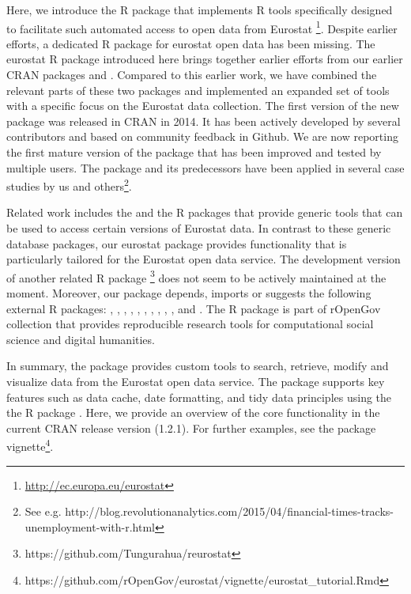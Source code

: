 Here, we introduce the  R package that implements R
tools specifically designed to facilitate such automated access to
open data from
Eurostat \footnote{\url{http://ec.europa.eu/eurostat}}. Despite
earlier efforts, a dedicated R package for eurostat open data has been
missing. The eurostat R package introduced here brings together
earlier efforts from our earlier CRAN
packages  \citep{statfi} and 
\citep{smarterpoland}. Compared to this earlier work, we have combined the
relevant parts of these two packages and implemented an expanded set
of tools with a specific focus on the Eurostat data collection. The
first version of the new  package was released in
CRAN in 2014. It has been actively developed by several contributors
and based on community feedback in Github. We are now reporting the
first mature version of the package that has been improved and tested
by multiple users. The package and its predecessors have been applied
in several case studies by us and others\footnote{See
e.g. http://blog.revolutionanalytics.com/2015/04/financial-times-tracks-unemployment-with-r.html}.

Related work includes the  \citep{datamart} and the
\citep{quandl} R packages that provide generic tools that can be used to access
certain versions of Eurostat data. In contrast to these generic
database packages, our eurostat package provides functionality that is
particularly tailored for the Eurostat open data service. The
development version of another related R package
\footnote{https://github.com/Tungurahua/reurostat} does not seem to be actively maintained at the moment.
Moreover, our  package depends, imports or suggests
the following external R packages:
 \citep{devtools},  \citep{dplyr},
 \citep{knitr},  \citep{ggplot2},
 \citep{mapproj},  \citep{plotrix},
 \citep{reshape2}, 
\citep{rmarkdown},  \citep{stringi},
 \citep{testthat}, and 
\citep{tidyr}. The  R package is
part of rOpenGov collection
\citep{Lahti13icml} that provides reproducible research tools for
computational social science and digital humanities.

In summary, the  package provides custom tools to
search, retrieve, modify and visualize data from the Eurostat open
data service. The package supports key features such as data cache,
date formatting, and tidy data principles \citep{wickham2014} using
the the  R package \citep{tidyr}. Here, we provide an
overview of the core functionality in the current CRAN release version
(1.2.1). For further examples, see the package
vignette\footnote{https://github.com/rOpenGov/eurostat/vignette/eurostat\_tutorial.Rmd}.


